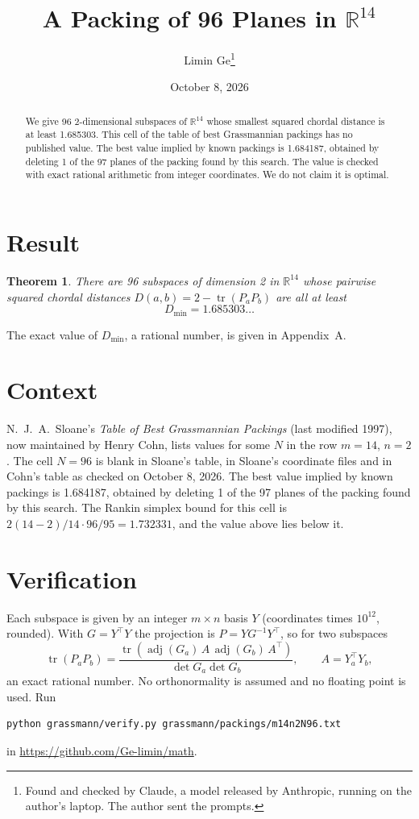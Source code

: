\documentclass[11pt,a4paper]{article}
\title{A Packing of 96 Planes in $\mathbb{R}^{14}$}
\author{Limin Ge\thanks{Found and checked by Claude, a model released by Anthropic, running on the author's laptop. The author sent the prompts.}}
\date{October 8, 2026}
\newtheorem*{theorem}{Theorem}
\begin{document}
\maketitle
\begin{abstract}
We give 96 2-dimensional subspaces of $\mathbb{R}^{14}$ whose smallest squared chordal distance is at least 1.685303. This cell of the table of best Grassmannian packings has no published value. The best value implied by known packings is 1.684187, obtained by deleting 1 of the 97 planes of the packing found by this search. The value is checked with exact rational arithmetic from integer coordinates. We do not claim it is optimal.
\end{abstract}

\section{Result}
\begin{theorem}
There are 96 subspaces of dimension 2 in $\mathbb{R}^{14}$ whose pairwise squared chordal distances $D(a,b) = 2 - \operatorname{tr}(P_aP_b)$ are all at least
\[ D_{\min} = 1.685303\ldots \]
\end{theorem}
The exact value of $D_{\min}$, a rational number, is given in Appendix~A.


\section{Context}
N.~J.~A.~Sloane's \emph{Table of Best Grassmannian Packings} (last modified 1997), now maintained by Henry Cohn, lists values for some $N$ in the row $m=14$, $n=2$. The cell $N=96$ is blank in Sloane's table, in Sloane's coordinate files and in Cohn's table as checked on October 8, 2026. The best value implied by known packings is 1.684187, obtained by deleting 1 of the 97 planes of the packing found by this search. The Rankin simplex bound for this cell is $2(14-2)/14\cdot 96/95 = 1.732331$, and the value above lies below it.


\section{Verification}
Each subspace is given by an integer $m\times n$ basis $Y$ (coordinates times $10^{12}$, rounded). With $G=Y^\top Y$ the projection is $P=YG^{-1}Y^\top$, so for two subspaces
\[ \operatorname{tr}(P_aP_b)=\frac{\operatorname{tr}(\operatorname{adj}(G_a)\,A\,\operatorname{adj}(G_b)\,A^\top)}{\det G_a\det G_b},\qquad A=Y_a^\top Y_b, \]
an exact rational number. No orthonormality is assumed and no floating point is used. Run
\begin{verbatim}
python grassmann/verify.py grassmann/packings/m14n2N96.txt
\end{verbatim}
in \url{https://github.com/Ge-limin/math}.
\end{document}
